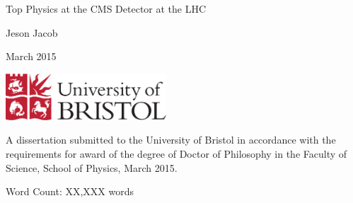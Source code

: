 \begin{titlepage}
	
	\begin{center}
		
		\vspace*{1cm}
		
		\Huge
		
		Top Physics at the CMS Detector at the LHC

		\vspace{0.5cm}
		
		\large
		
		Jeson Jacob
		
		\vspace{0.5cm}
		
		March 2015
		
		\vspace{0.5cm}
		
		\includegraphics[width=60mm]{Images/UnivShield}
		
		\vfill
		
		\normalsize
	\end{center}
	A dissertation submitted to the University of Bristol in accordance with the
	requirements for award of the degree of Doctor of Philosophy in the Faculty of
	Science, School of Physics, March 2015.

	\begin{flushright}
		Word Count: XX,XXX words
	\end{flushright}

\end{titlepage}